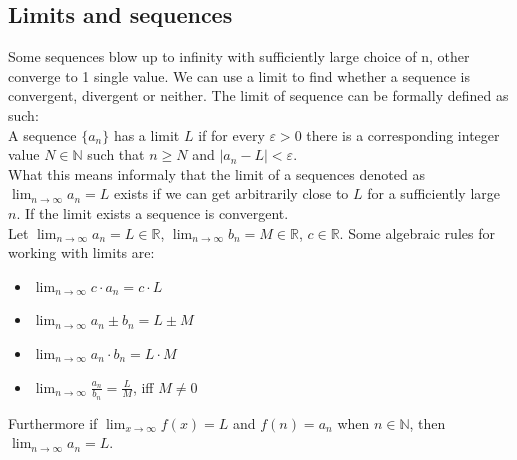 \documentclass[11pt, a4paper]{article}
\newcommand*{\R}{\ensuremath{\mathbb{R}}}
\newcommand*{\N}{\ensuremath{\mathbb{N}}}
\renewcommand*{\epsilon}{\varepsilon}
\begin{document}
\subsection{Limits and sequences}
Some sequences blow up to infinity with sufficiently large choice of n, other converge to 1 single value. We can use a limit to find whether a sequence is convergent, divergent or neither. The limit of sequence can be formally defined as such:\\
A sequence $\{ a_n \}$ has a limit $L$ if for every $\epsilon > 0$ there is a corresponding integer value $N \in \N$ such that $n\geq N$ and $|a_n - L| < \epsilon$.\\
What this means informaly that the limit of a sequences denoted as $\lim_{n \to \infty} a_n = L$ exists if we can get arbitrarily close to $L$ for a sufficiently large $n$. If the limit exists a sequence is convergent.\\
Let $\lim_{n \to \infty} a_n = L \in \R$, $\lim_{n \to \infty} b_n = M \in \R$, $c \in \R$. Some algebraic rules for working with limits are:
\begin{itemize}
  \item $\lim_{n \to \infty} c\cdot a_n = c \cdot L$
  \item $\lim_{n \to \infty} a_n \pm b_n = L \pm M$
  \item $\lim_{n \to \infty} a_n \cdot b_n = L \cdot M$
  \item $\lim_{n \to \infty} \frac{a_n}{b_n} = \frac{L}{M}$, iff $M \neq 0$
\end{itemize}
Furthermore if $\lim_{x\to \infty} f(x) = L$ and $f(n) = a_n$ when $n \in \N$, then $\lim_{n \to \infty} a_n = L$.
\end{document}

